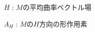 \documentclass[dvipdfmx, xcolor=svgnames]{beamer}
\theoremstyle{plain}
\theoremstyle{definition}
\theoremstyle{remark}
\begin{document}
{\begin{theorem}
\hspace{3pt}\(H\)\hspace{2pt} : \(M\)の平均曲率ベクトル場\vspace{3pt}

\(A_H\) : \(M\)の\(H\)方向の形作用素
    



\end{theorem}}
\end{document}
